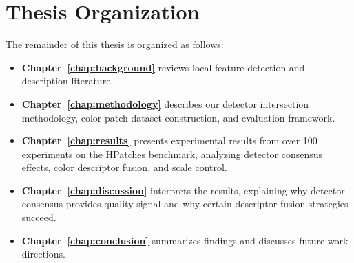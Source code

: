 \section{Thesis Organization}

The remainder of this thesis is organized as follows:

\begin{itemize}
    \item \textbf{Chapter~\ref{chap:background}} reviews local feature detection and description literature.

    \item \textbf{Chapter~\ref{chap:methodology}} describes our detector intersection methodology, color patch dataset construction, and evaluation framework.

    \item \textbf{Chapter~\ref{chap:results}} presents experimental results from over 100 experiments on the HPatches benchmark, analyzing detector consensus effects, color descriptor fusion, and scale control.

    \item \textbf{Chapter~\ref{chap:discussion}} interprets the results, explaining why detector consensus provides quality signal and why certain descriptor fusion strategies succeed.

    \item \textbf{Chapter~\ref{chap:conclusion}} summarizes findings and discusses future work directions.
\end{itemize}
